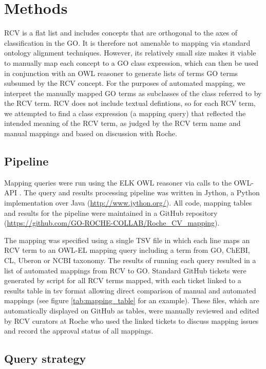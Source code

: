 \documentclass[runningheads,a4paper]{llncs}
\begin{document}
{{\section{Methods}

RCV is a flat list and includes concepts that are orthogonal to the axes of classification in the \ac{GO}. It is therefore not amenable to mapping via standard ontology alignment techniques. %
  However, its relatively small size makes it viable to manually map each concept to a GO class expression, which can then be used in conjunction with an OWL reasoner to generate lists of terms GO terms subsumed by the RCV concept. For the purposes of automated mapping, we interpret the manually mapped \ac{GO} terms as subclasses of the class referred to by the RCV term. RCV does not include textual defintions, so for each RCV term, we attempted to find a class expression (a mapping query) that reflected the intended meaning of the RCV term, as judged by the RCV term name and manual mappings and based on discussion with Roche.

\subsection{Pipeline}

Mapping queries were run using the ELK OWL reasoner \cite{kazakov2012} via calls to the OWL-API \cite{Horridge2011}.  The query and results processing pipeline was written in Jython, a Python implementation over Java (\url{http://www.jython.org/}).  All code, mapping tables and results for the pipeline were maintained in a GitHub repository (\url{https://github.com/GO-ROCHE-COLLAB/Roche_CV_mapping}). 

The mapping was specified using a single TSV file in which each line maps an RCV term to an OWL-EL mapping query including a term from \ac{GO}, ChEBI, CL, Uberon or NCBI taxonomy.  The results of running each query resulted in a list of automated mappings from RCV to GO. Standard GitHub tickets were generated by script for all RCV terms mapped, with each ticket linked to a results table in tsv format allowing direct comparison of manual and automated mappings (see figure \ref{tab:mapping_table} for an example).  These files, which are automatically displayed on GitHub as tables, were manually reviewed and edited by RCV curators at Roche who used the linked tickets to discuss mapping issues and record the approval status of all mappings.

\subsection{Query strategy}

}}
\end{document}
